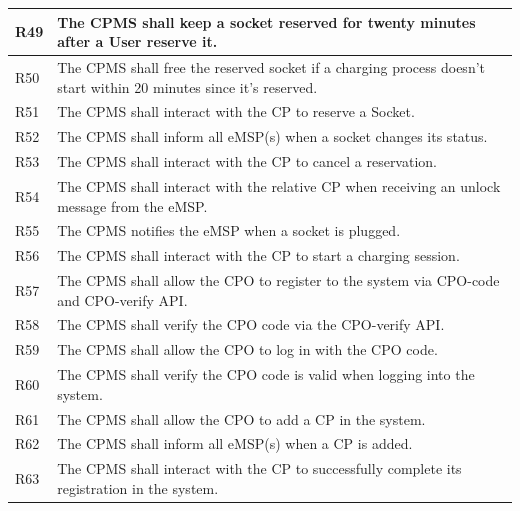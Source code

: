 \documentclass{Configuration_Files/PoliMi3i_thesis}
\begin{document}
\begin{xltabular}{\textwidth}{| >{}l | X |}
\hline
R49 &
    The CPMS shall keep a socket reserved for twenty minutes after a User reserve it.\B\\
\hline

R50  &
    The CPMS shall free the reserved socket if a charging process doesn’t start within 20 minutes since it's reserved.\B\\
\hline

R51  &
    The CPMS shall interact with the CP to reserve a Socket.\B\\
\hline

R52  &
    The CPMS shall inform all eMSP(s) when a socket changes its status.\B\\
\hline

R53  &
    The CPMS shall interact with the CP to cancel a reservation.\B\\
\hline

R54  &
    The CPMS shall interact with the relative CP when receiving an unlock message from the eMSP.\B\\
\hline

R55 &
    The CPMS  notifies the eMSP when a socket is plugged.\B\\
\hline

R56 &
    The CPMS shall interact with the CP to start a charging session.\B\\
\hline

R57  &
    The CPMS shall allow the CPO to register to the system via CPO-code and CPO-verify API.\B\\
\hline

R58 & 
    The CPMS shall verify the CPO code via the CPO-verify API.\B\\
\hline
    
R59  &
     The CPMS shall allow the CPO to log in with the CPO code.\B\\
\hline
R60   &
     The CPMS shall verify the CPO code is valid when logging into the system.\B\\
\hline

R61 &
    The CPMS shall allow the CPO to add a CP in the system.\B\\
\hline

R62  &  
    The CPMS shall inform all eMSP(s) when a CP is added.\B\\
\hline
    
R63 & 
    The CPMS shall interact with the CP to successfully complete its registration in the system.\B\\
\hline


\end{xltabular}
\end{document}
